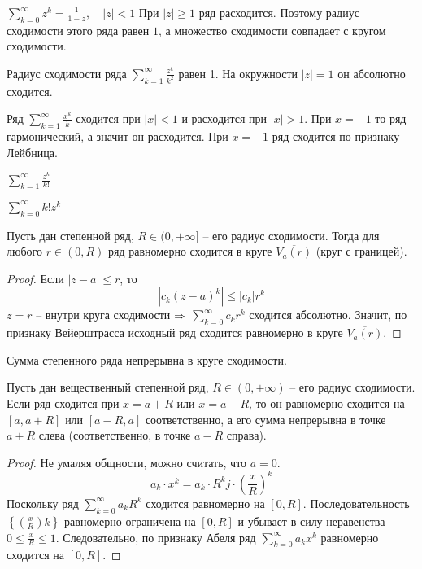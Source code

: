 \begin{Example}
	$\sum_{k=0}^{\infty} z^k = \frac{1}{1 - z}, \quad |z| < 1$
	При $|z| \geqslant 1$ ряд расходится. Поэтому радиус сходимости этого ряда равен $1$, а множество сходимости совпадает с кругом сходимости. 
\end{Example}

\begin{Example}
	Радиус сходимости ряда $\sum_{k=1}^{\infty} \frac{z^k}{k^2}$ равен 1. На окружности $|z| = 1$ он абсолютно сходится.
\end{Example}

\begin{Example}
	Ряд $\sum_{k=1}^{\infty} \frac{x^k}{k}$ сходится при $|x| < 1$ и расходится при $|x| > 1$. При $x = -1$ то ряд -- гармонический, а значит он расходится.
	При $x = -1$ ряд сходится по признаку Лейбница. 
\end{Example}

\begin{Ex}
	$\sum_{k=1}^{\infty} \frac{z^k}{k!}$ 
\end{Ex}

\begin{Ex}
	$\sum_{k=0}^{\infty} k! z^k$ 
\end{Ex}

\begin{Thm}
	Пусть дан степенной ряд, $R \in (0, +\infty]$ -- его радиус сходимости. 
	Тогда для любого $r \in (0, R)$ ряд равномерно сходится в круге $\overline{V_a(r)}$ (круг с границей).
\end{Thm}

\begin{proof}
	Если $|z - a| \leqslant r$, то
	\[|c_k (z - a)^k| \leqslant |c_k| r^k\]	
	$z = r$ -- внутри круга сходимости $\Rightarrow$ $\sum_{k=0}^{\infty} c_k r^k$ сходится абсолютно.
	Значит, по признаку Вейерштрасса исходный ряд сходится равномерно в круге $\overline{V_a(r)}$.  
\end{proof}

\begin{Cons}
	Сумма степенного ряда непрерывна в круге сходимости.
\end{Cons}

\begin{Thm}
	Пусть дан вещественный степенной ряд, $R \in (0, +\infty)$ -- его радиус сходимости.
	Если ряд сходится при $x = a + R$ или $x = a - R$, то он равномерно сходится на $[a, a + R]$ или $[a - R, a]$ соответственно,
	а его сумма непрерывна в точке $a + R$ слева (соответственно, в точке $a - R$ справа).  
\end{Thm}

\begin{proof}
	Не умаляя общности, можно считать, что $a = 0$.
	\[a_k \cdot x^k = a_k \cdot R^kj \cdot \left(\frac{x}{R}\right)^k\]
	Поскольку ряд $\sum_{k=0}^{\infty} a_k R^k$ сходится равномерно на $[0, R]$. Последовательность $\left\{\left(\frac{x}{R}\right)k\right\}$ равномерно ограничена на $[0, R]$ и убывает в силу неравенства $0 \leqslant \frac{x}{R} \leqslant 1$.
	Следовательно, по признаку Абеля ряд $\sum_{k=0}^{\infty} a_k x^k$ равномерно сходится на $[0, R]$.  
\end{proof}

